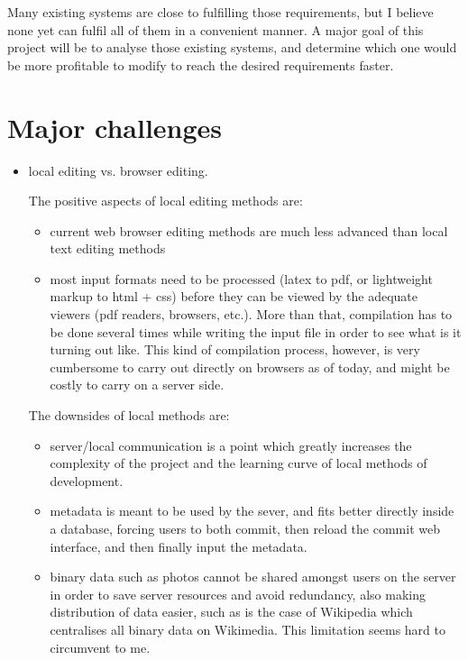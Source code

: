 \documentclass[12pt]{article}
\begin{document}
Many existing systems are close to fulfilling those requirements, but I believe none yet can fulfil all of them in a convenient manner. A major goal of this project will be to analyse those existing systems, and determine which one would be more profitable to modify to reach the desired requirements faster.

\section{Major challenges}

\begin{itemize}
  \item local editing vs. browser editing.
  
  The positive aspects of local editing methods are:
  \begin{itemize}
    \item current web browser editing methods are much less advanced than local text editing methods
    \item most input formats need to be processed (latex to pdf, or lightweight markup to html + css) before they can be viewed by the adequate viewers (pdf readers, browsers, etc.). More than that, compilation has to be done several times while writing the input file in order to see what is it turning out like. This kind of compilation process, however, is very cumbersome to carry out directly on browsers as of today, and might be costly to carry on a server side.
  \end{itemize}    
  
  The downsides of local methods are:
  \begin{itemize}
    \item server/local communication is a point which greatly increases the complexity of the project and the learning curve of local methods of development.
    
    \item metadata is meant to be used by the sever, and fits better directly inside a database, forcing users to both commit, then reload the commit web interface, and then finally input the metadata.
    \item binary data such as photos cannot be shared amongst users on the server in order to save server resources and avoid redundancy, also making distribution of data easier, such as is the case of Wikipedia which centralises all binary data on Wikimedia. This limitation seems hard to circumvent to me.
  \end{itemize}
  

\end{itemize}
\end{document}
